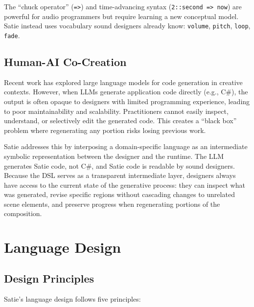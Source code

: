 \documentclass[sigconf,anonymous,review]{nimeart}
\begin{document}
The ``chuck operator'' (\texttt{=>}) and time-advancing syntax (\texttt{2::second => now}) are powerful for audio programmers but require learning a new conceptual model. Satie instead uses vocabulary sound designers already know: \texttt{volume}, \texttt{pitch}, \texttt{loop}, \texttt{fade}.

\subsection{Human-AI Co-Creation}

Recent work has explored large language models for code generation in creative contexts. However, when LLMs generate application code directly (e.g., C\#), the output is often opaque to designers with limited programming experience, leading to poor maintainability and scalability. Practitioners cannot easily inspect, understand, or selectively edit the generated code. This creates a ``black box'' problem where regenerating any portion risks losing previous work.

Satie addresses this by interposing a domain-specific language as an intermediate symbolic representation between the designer and the runtime. The LLM generates Satie code, not C\#, and Satie code is readable by sound designers. Because the DSL serves as a transparent intermediate layer, designers always have access to the current state of the generative process: they can inspect what was generated, revise specific regions without cascading changes to unrelated scene elements, and preserve progress when regenerating portions of the composition.

\section{Language Design}

\subsection{Design Principles}

Satie's language design follows five principles:
\end{document}
